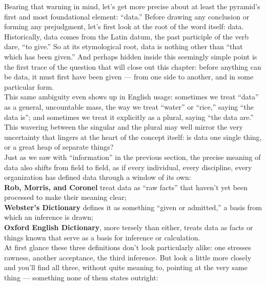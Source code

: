 Bearing that warning in mind, let's get more precise about at least the pyramid's first and most foundational element: ``data.'' Before drawing any conclusion or forming any prejudgment, let's first look at the root of the word itself: data.\\
Historically, data comes from the Latin datum, the past participle of the verb dare, ``to give.'' So at its etymological root, data is nothing other than ``that which has been given.'' And perhaps hidden inside this seemingly simple point is the first trace of the question that will close out this chapter: before anything can be data, it must first have been given --- from one side to another, and in some particular form.\\
This same ambiguity even shows up in English usage: sometimes we treat ``data'' as a general, uncountable mass, the way we treat ``water'' or ``rice,'' saying ``the data is''; and sometimes we treat it explicitly as a plural, saying ``the data are.'' This wavering between the singular and the plural may well mirror the very uncertainty that lingers at the heart of the concept itself: is data one single thing, or a great heap of separate things?\\
Just as we saw with ``information'' in the previous section, the precise meaning of data also shifts from field to field, as if every individual, every discipline, every organization has defined data through a window of its own\autocite{floridi2010,zins2007}:\\
\textbf{Rob, Morris, and Coronel} treat data as ``raw facts'' that haven't yet been processed to make their meaning clear\autocite{rob2013};\\
\textbf{Webster's Dictionary} defines it as something ``given or admitted,'' a basis from which an inference is drawn\autocite{websters1934};\\
\textbf{Oxford English Dictionary}, more tersely than either, treats data as facts or things known that serve as a basis for inference or calculation\autocite{oed2023}.\\
At first glance these three definitions don't look particularly alike: one stresses rawness, another acceptance, the third inference. But look a little more closely and you'll find all three, without quite meaning to, pointing at the very same thing --- something none of them states outright:

